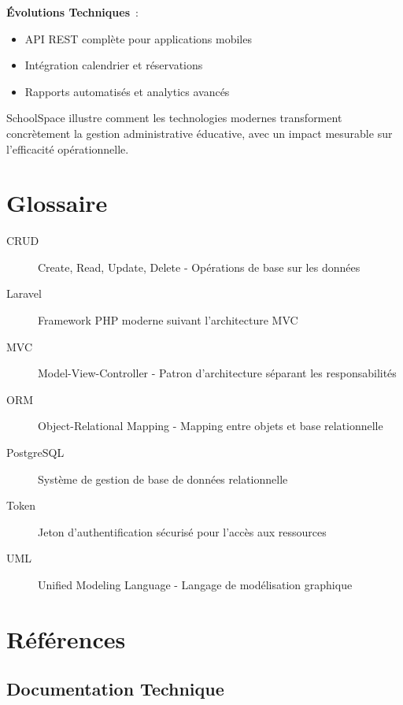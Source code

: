 \documentclass[12pt, a4paper, twoside, openany]{report}
\begin{document}
\textbf{Évolutions Techniques}~:
\begin{itemize}
    \item API REST complète pour applications mobiles
    \item Intégration calendrier et réservations
    \item Rapports automatisés et analytics avancés
\end{itemize}

SchoolSpace illustre comment les technologies modernes transforment concrètement la gestion administrative éducative, avec un impact mesurable sur l'efficacité opérationnelle.

\chapter*{Glossaire}

\begin{description}
\item[CRUD] Create, Read, Update, Delete - Opérations de base sur les données
\item[Laravel] Framework PHP moderne suivant l'architecture MVC
\item[MVC] Model-View-Controller - Patron d'architecture séparant les responsabilités
\item[ORM] Object-Relational Mapping - Mapping entre objets et base relationnelle
\item[PostgreSQL] Système de gestion de base de données relationnelle
\item[Token] Jeton d'authentification sécurisé pour l'accès aux ressources
\item[UML] Unified Modeling Language - Langage de modélisation graphique
\end{description}

\chapter*{Références}

\section*{Documentation Technique}
\end{document}
